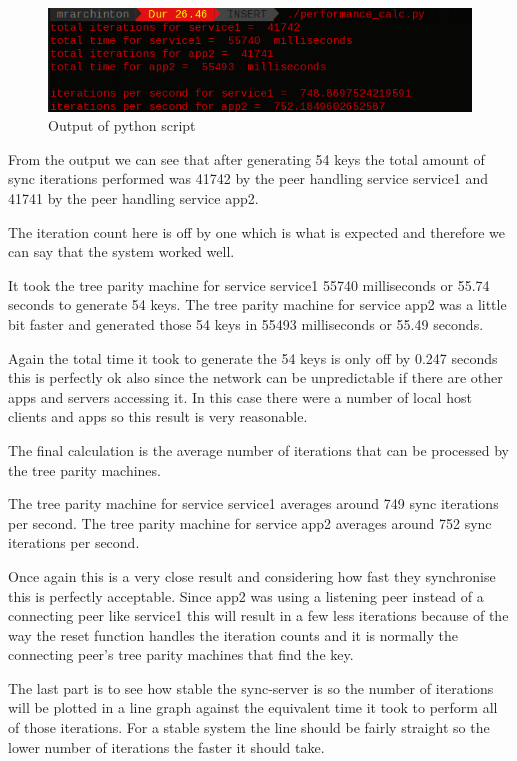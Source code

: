 \begin{figure}[!h]
	\centering
	\includegraphics[width=1\textwidth]{Figures/sync12.png}
	\caption[Output of python script]{Output of python script}
	\label{fig:sync12}
\end{figure}
\FloatBarrier
From the output we can see that after generating 54 keys the total amount of sync iterations performed was 41742 by the peer handling service service1 and 41741 by the peer handling service app2. 

The iteration count here is off by one which is what is expected and therefore we can say that the system worked well.

It took the tree parity machine for service service1 55740 milliseconds or 55.74 seconds to generate 54 keys. The tree parity machine for service app2 was a little bit faster and generated those 54 keys in 55493 milliseconds or 55.49 seconds. 

Again the total time it took to generate the 54 keys is only off by 0.247 seconds this is perfectly ok also since the network can be unpredictable if there are other apps and servers accessing it. In this case there were a number of local host clients and apps so this result is very reasonable.

The final calculation is the average number of iterations that can be processed by the tree parity machines.

The tree parity machine for service service1 averages around 749 sync iterations per second. The tree parity machine for service app2 averages around 752 sync iterations per second. 

Once again this is a very close result and considering how fast they synchronise this is perfectly acceptable. Since app2 was using a listening peer instead of a connecting peer like service1 this will result in a few less iterations because of the way the reset function handles the iteration counts and it is normally the connecting peer's tree parity machines that find the key.

The last part is to see how stable the sync-server is so the number of iterations will be plotted in a line graph against the equivalent time it took to perform all of those iterations. For a stable system the line should be fairly straight so the lower number of iterations the faster it should take. 

